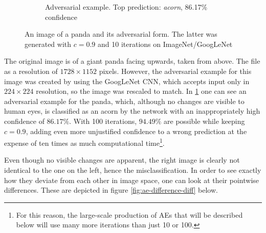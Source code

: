 \documentclass[11pt, a4paper]{article}
\begin{document}
\begin{figure}[htp]
\begin{subfigure}[b]{0.45\textwidth}
        \caption{Adversarial example. Top prediction: \emph{acorn}, 86.17\% confidence \\}
        \label{fig:ae-example-ae}
    \end{subfigure}
    \caption{An image of a panda and its adversarial form. The latter was generated with $c = 0.9$ and 10 iterations on ImageNet/GoogLeNet}
    \label{fig:ae-example}
\end{figure}

The original image is of a giant panda facing upwards, taken from above. The file as a resolution of $1728 \times 1152$ pixels. However, the adversarial example for this image was created by using the GoogLeNet CNN, which accepts input only in $224 \times 224$ resolution, so the image was rescaled to match. In \ref{fig:ae-example-ae} one can see an adversarial example for the panda, which, although no changes are visible to human eyes, is classified as an acorn by the network with an inappropriately high confidence of $86.17\%$. With 100 iterations, $94.49\%$ are possible while keeping $c = 0.9$, adding even more unjustified confidence to a wrong prediction at the expense of ten times as much computational time\footnote{For this reason, the large-scale production of AEs that will be described below will use many more iterations than just 10 or 100.}.

Even though no visible changes are apparent, the right image is clearly not identical to the one on the left, hence the misclassification. In order to see exactly how they deviate from each other in image space, one can look at their pointwise differences. These are depicted in figure \ref{fig:ae-difference-diff} below.
\end{document}
